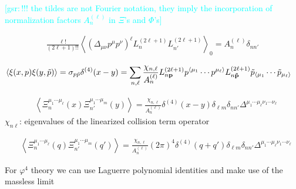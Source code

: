 \documentclass[aps,prd,preprint,nofootinbib,amsmath,amssymb,showpacs,longbibliography,singlecolumn,superscriptaddress,10pt]{revtex4-1}
\theoremstyle{plain}
\theoremstyle{definition}
\newcommand{\gsr}[1]{{\textcolor{cyan}{[gsr:\,{#1}]}}}
\begin{document}
\gsr{!!! the tildes are not Fourier notation, they imply the incorporation of normalization factors $A_{n}^{(\ell)}$ in $\Xi$'s and $\Phi$'s}

\begin{equation}
\begin{aligned}
\frac{\ell!}{(2 \ell + 1)!!}\left\langle \left(\Delta_{\mu \nu} p^{\mu} p^{\nu}\right)^{\ell} 
L_{n}^{(2 \ell +1)} L_{n'}^{(2\ell+1)} 
 \right\rangle_{0}
=
A_{n}^{(\ell)} \delta_{n n'}
\end{aligned}    
\end{equation}


\begin{equation}
\begin{aligned}
&
\langle \xi(x, p) \xi(y,\Tilde{p}) \rangle
= 
\sigma_{p \Tilde{p}} \delta^{(4)}(x-y)
=
\sum_{n,\ell}\frac{\chi_{n,\ell}}{A_{n}^{(\ell)}} 
L^{(2 \ell + 1)}_{n {\bf p}} p^{\langle \mu_{1}} \cdots p^{\mu_{\ell} \rangle}
L^{(2 \ell + 1)}_{n {\bf \Tilde{p}}} \Tilde{p}_{\langle \mu_{1}} \cdots \Tilde{p}_{\mu_{\ell} \rangle}
\end{aligned}    
\end{equation}



\begin{equation}
\begin{aligned}
&
\left\langle \Xi_{n}^{\mu_{1} \cdots \mu_{\ell}}(x) \Xi_{n'}^{\mu_{1} \cdots \mu_{m}}(y)
\right\rangle
= 
\frac{\chi_{n,\ell}}{A_{n}^{(\ell)}} \delta^{(4)}(x-y) \delta_{\ell m} \delta_{nn'} \Delta^{\mu_{1} \cdots \mu_{\ell}\nu_{1} \cdots \nu_{\ell}}
\end{aligned}    
\end{equation}
%
$\chi_{n \ell} $: eigenvalues of the linearized collision term operator

\begin{equation}
\begin{aligned}
&
\left\langle \Xi_{n}^{\mu_{1} \cdots \mu_{\ell}}(q) \Xi_{n'}^{\mu_{1} \cdots \mu_{m}}(q')
\right\rangle
= 
\frac{\chi_{n,\ell}}{A_{n}^{(\ell)}} (2 \pi)^{4} \delta^{(4)}(q+q') \delta_{\ell m} \delta_{nn'} \Delta^{\mu_{1} \cdots \mu_{\ell}\nu_{1} \cdots \nu_{\ell}}
\end{aligned}    
\end{equation}
%

For $\varphi^{4}$ theory we can use Laguerre polynomial identities and make use of the massless limit
\end{document}
